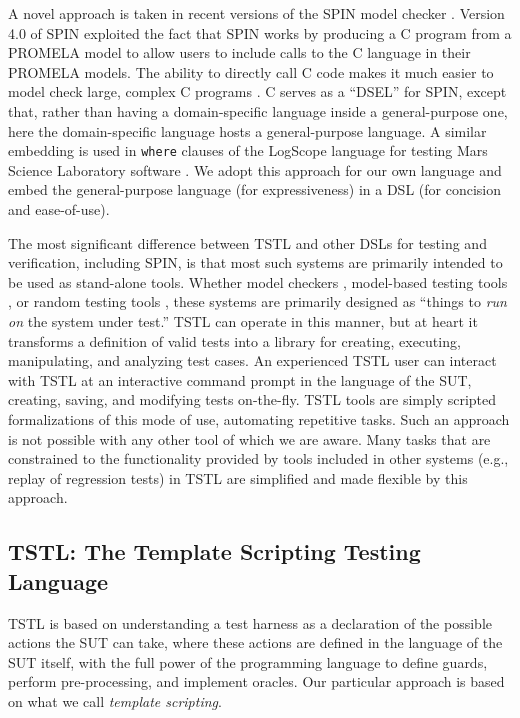 A novel approach is taken in recent versions of the SPIN model checker
\cite{SPIN}.  Version 4.0 of SPIN \cite{ModelDriven} exploited the
fact that SPIN works by producing a C program from a PROMELA model
to allow users to include calls to the C language in their PROMELA models.  The
ability to directly call C code makes it much easier to model check
large, complex C programs \cite{AMAI,ModelCode}.  C serves as a
``DSEL'' for SPIN, except that, rather than having a domain-specific
language inside a general-purpose one, here the domain-specific
language hosts a general-purpose language.  A similar embedding is
used in {\tt where} clauses of the LogScope language for testing Mars
Science Laboratory software \cite{scriptstospecs}.  We adopt this
approach for our own language and embed the general-purpose language (for expressiveness) in a
DSL (for concision and ease-of-use).

The most significant difference between TSTL and other DSLs for
testing and verification, including SPIN, is that most such systems
are primarily intended to be used as stand-alone tools.  Whether model
checkers \cite{SPIN,JPF2}, model-based testing tools \cite{Taxonomy},
or random testing tools \cite{Pacheco}, these systems are primarily
designed as ``things to \emph{run on} the system under test.''  TSTL
can operate in this manner, but at heart it transforms a definition of
valid tests into a library for creating, executing, manipulating, and
analyzing test cases.  An experienced TSTL user can interact with TSTL
at an interactive command prompt in the language of the SUT, creating,
saving, and modifying tests on-the-fly.  TSTL tools are simply
scripted formalizations of this mode of use, automating repetitive
tasks.  Such an approach is not possible with any other tool of which we
are aware.  Many tasks that are constrained to the functionality provided
by  tools included in other systems (e.g., replay of regression tests) in
TSTL are simplified and made flexible by this approach.

\subsection{TSTL: The Template Scripting Testing Language}

TSTL is based on understanding a test harness as a declaration
  of the possible actions the SUT can take, where these actions are
defined in the language of the SUT itself, with the full power
of the programming language to define guards, perform
pre-processing, and implement oracles.  Our particular approach is
based on what we call \emph{template scripting}.

